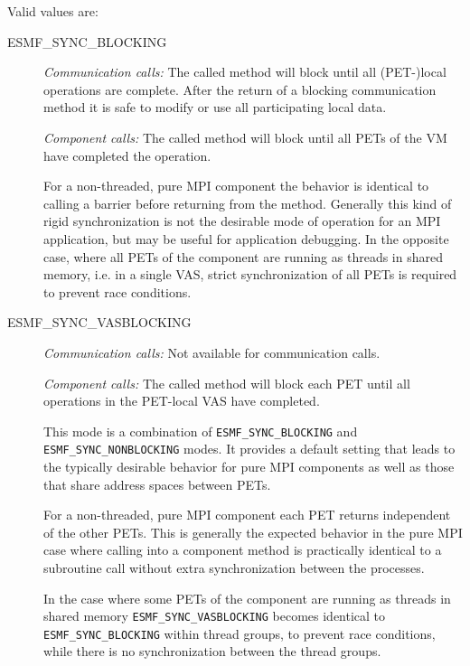 Valid values are:
\begin{description}

\item [ESMF\_SYNC\_BLOCKING]
         {\em Communication calls:} The called method will block until all
         (PET-)local operations are complete. After the return of a blocking
         communication method it is safe to modify or use all participating
         local data.
         
         {\em Component calls:} The called method will block until all PETs of
         the VM have completed the operation.
         
         For a non-threaded, pure MPI
         component the behavior is identical to calling a barrier before 
         returning from the method. Generally this kind of rigid 
         synchronization is not the desirable mode of operation for an MPI
         application, but may be useful for application debugging.
         In the opposite case, where all PETs of the component are running as
         threads in shared memory, i.e. in a single VAS, strict synchronization
         of all PETs is required to prevent race conditions.

\item [ESMF\_SYNC\_VASBLOCKING]
         {\em Communication calls:} Not available for communication calls.
         
         {\em Component calls:} The called method will block each PET until
         all operations in the PET-local VAS have completed. 
         
         This mode is a combination of {\tt ESMF\_SYNC\_BLOCKING} and
         {\tt ESMF\_SYNC\_NONBLOCKING} modes. It provides a default setting 
         that leads to the typically desirable behavior for pure MPI 
         components as well as those that share address spaces between PETs.
         
         For a non-threaded, pure MPI component each PET returns
         independent of the other PETs. This is generally the expected 
         behavior in the pure MPI case where calling into a component method is
         practically identical to a subroutine call without extra 
         synchronization between the processes.
         
         In the case where some PETs of the component are running as
         threads in shared memory {\tt ESMF\_SYNC\_VASBLOCKING} becomes identical
         to {\tt ESMF\_SYNC\_BLOCKING} within thread groups, to prevent race
         conditions, while there is no synchronization between the thread
         groups.
         

\end{description}
